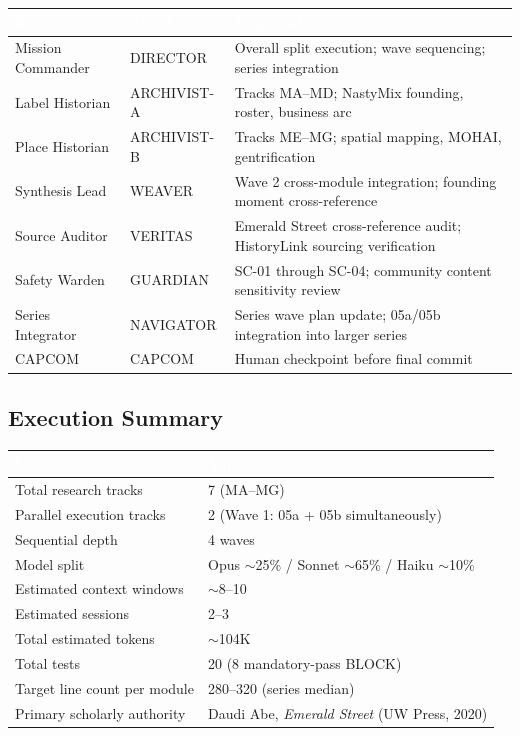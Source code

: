 \documentclass[11pt,letterpaper]{article}
\newcommand{\tableheader}[1]{\textbf{\sffamily\textcolor{white}{#1}}}
\begin{document}
\begin{center}
\begin{tabularx}{\textwidth}{L{2.5cm}L{3cm}X}
\toprule
{}
\tableheader{Role} & \tableheader{Agent} & \tableheader{Responsibility} \\
\midrule
Mission Commander & DIRECTOR & Overall split execution; wave sequencing; series integration \\
Label Historian & ARCHIVIST-A & Tracks MA--MD; NastyMix founding, roster, business arc \\
Place Historian & ARCHIVIST-B & Tracks ME--MG; spatial mapping, MOHAI, gentrification \\
Synthesis Lead & WEAVER & Wave 2 cross-module integration; founding moment cross-reference \\
Source Auditor & VERITAS & Emerald Street cross-reference audit; HistoryLink sourcing verification \\
Safety Warden & GUARDIAN & SC-01 through SC-04; community content sensitivity review \\
Series Integrator & NAVIGATOR & Series wave plan update; 05a/05b integration into larger series \\
CAPCOM & CAPCOM & Human checkpoint before final commit \\
\bottomrule
\end{tabularx}
\end{center}

\subsection{Execution Summary}

\begin{center}
\begin{tabularx}{\textwidth}{L{5cm}X}
\toprule
{}
\tableheader{Metric} & \tableheader{Value} \\
\midrule
Total research tracks & 7 (MA--MG) \\
Parallel execution tracks & 2 (Wave 1: 05a + 05b simultaneously) \\
Sequential depth & 4 waves \\
Model split & Opus $\sim$25\% / Sonnet $\sim$65\% / Haiku $\sim$10\% \\
Estimated context windows & $\sim$8--10 \\
Estimated sessions & 2--3 \\
Total estimated tokens & $\sim$104K \\
Total tests & 20 (8 mandatory-pass BLOCK) \\
Target line count per module & 280--320 (series median) \\
Primary scholarly authority & Daudi Abe, \textit{Emerald Street} (UW Press, 2020) \\
\bottomrule
\end{tabularx}
\end{center}
\end{document}
